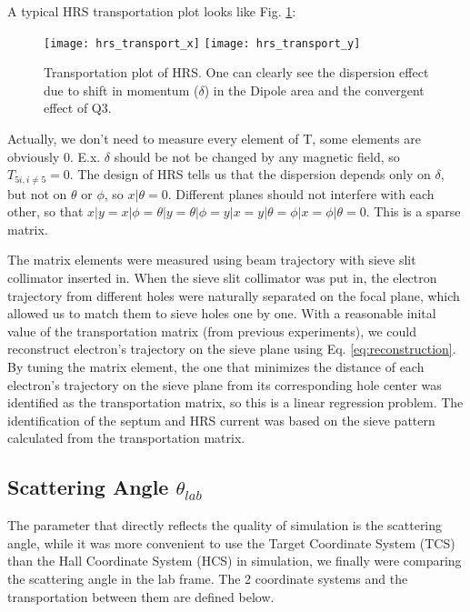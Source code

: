 A typical HRS transportation plot looks like Fig. \ref{fig:hrs_transport}:
\begin{figure}[H]
    \texttt{[image: hrs\_transport\_x]}
    \texttt{[image: hrs\_transport\_y]}
    \caption{Transportation plot of HRS. One can clearly see the dispersion effect
    due to shift in momentum ($\delta$) in the Dipole area and the convergent effect
    of Q3.}
    \label{fig:hrs_transport}
\end{figure}

Actually, we don't need to measure every element of T, some elements are obviously
0. E.x. $\delta$ should be not be changed by any magnetic field, so $T_{5i, i\ne 5} = 0$.
The design of HRS tells us that the dispersion depends only on $\delta$, but not
on $\theta$ or $\phi$, so $x|\theta = 0$. Different planes should not
interfere with each other, so that $x|y = x|\phi = \theta|y = \theta|\phi 
= y|x = y|\theta = \phi|x = \phi|\theta = 0$. This is a sparse matrix.

The matrix elements were measured using beam trajectory with sieve slit collimator
inserted in. When the sieve slit collimator was put in, the electron trajectory
from different holes were naturally separated on the focal plane, which allowed
us to match them to sieve holes one by one. With a reasonable inital value of 
the transportation matrix (from previous experiments),
we could reconstruct electron's trajectory on the sieve plane using Eq. \ref{eq:reconstruction}.
By tuning the matrix element, the one that minimizes the distance of each electron's trajectory on the sieve
plane from its corresponding hole center was identified as the transportation
matrix, so this is a linear regression problem. The identification of the septum 
and HRS current was based on the sieve pattern calculated from the 
transportation matrix. 


\subsection{Scattering Angle $\theta_{lab}$}
The parameter that directly reflects the quality of simulation is the scattering
angle, while it was more convenient to use the Target Coordinate System (TCS) 
than the Hall Coordinate System (HCS) in simulation, we finally were comparing
the scattering angle in the lab frame. The 2 coordinate systems and the transportation
between them are defined below.

